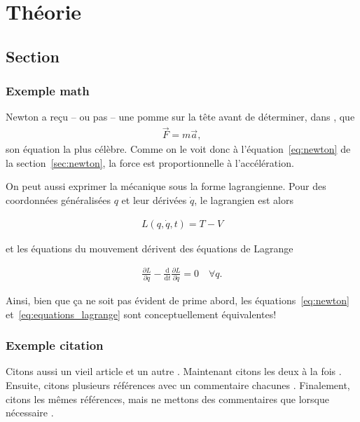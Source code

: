 \begin{comment}
\end{comment}

\chapter{Théorie}


\section{Section}
\subsection{Exemple math \label{sec:newton}}

Newton a reçu -- ou pas -- une pomme sur la tête avant de déterminer, dans \cite{newton1687philosophiae}, que
\begin{align}
    \label{eq:newton}
    \vec F=m \vec a,
\end{align}
son équation la plus célèbre. Comme on le voit donc à l'équation~\eqref{eq:newton} de la section~\ref{sec:newton}, la force est proportionnelle à l'accélération.

On peut aussi exprimer la mécanique sous la forme lagrangienne. Pour des coordonnées généralisées $q$ et leur dérivées $\dot q$, le lagrangien est alors

\begin{align}
    \label{eq:lagrangien}
    L(q, \dot q, t) = T - V
\end{align}

et les équations du mouvement dérivent des équations de Lagrange 

\begin{align}
    \label{eq:equations_lagrange}
    \frac{\partial L}{\partial q} - \frac{\mathrm{d}}{\mathrm{d}t}\frac{\partial L}{\partial \dot q} = 0 \quad \forall q
    .   %
\end{align}

Ainsi, bien que ça ne soit pas évident de prime abord, les équations~\eqref{eq:newton} et~\eqref{eq:equations_lagrange} sont conceptuellement équivalentes!

\subsection{Exemple citation}
Citons aussi un vieil article \cite{andreev1964} et un autre \cite{robertson1929}. Maintenant citons les deux à la fois \cite{andreev1964, robertson1929}. Ensuite, citons plusieurs références avec un commentaire chacunes \cites[p.~1]{robertson1929}[chap.~2]{andreev1964}[]{newton1687philosophiae}. Finalement, citons les mêmes références, mais ne mettons des commentaires que lorsque nécessaire \cites{robertson1929}[chap.~2]{andreev1964}{newton1687philosophiae}.

